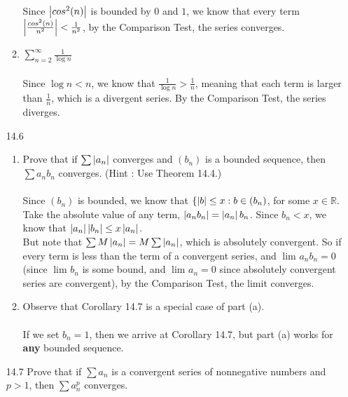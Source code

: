 \begin{enumerate}
\begin{enumerate}
        Since $\left\vert cos^2(n) \right\vert$ is bounded by $0$ and $1$, we know that every term $\left\vert \frac{cos^2(n)}{n^2} \right\vert < \frac{1}{n^2}$, by the Comparison Test, the series converges.\\

      \item $\sum_{n=2}^\infty \frac{1}{\log n}$\\\\

        Since $\log n < n$, we know that $\frac{1}{\log n} > \frac{1}{n}$, meaning that each term is larger than $\frac{1}{n}$, which is a divergent series. By the Comparison Test, the series diverges.\\
    \end{enumerate}
  \item [14.6]
    \begin{enumerate}
      \item Prove that if $\sum \left\vert a_n \right\vert$ converges and $(b_n)$ is a bounded sequence, then $\sum a_nb_n$ converges. (Hint : Use Theorem 14.4.)\\\\

        Since $(b_n)$ is bounded, we know that $\{\left\vert b \right\vert \leq x : b \in (b_n)$, for some $x \in \mathds{R}$. Take the absolute value of any term, $\left\vert a_nb_n \right\vert = \left\vert a_n \right\vert{b_n}$. Since $b_n < x$, we know that $\left\vert a_n \right\vert\left\vert b_n \right\vert \leq x \left\vert a_n \right\vert$.\\

        But note that $\sum M \left\vert a_n \right\vert = M \sum \left\vert a_n \right\vert$, which is absolutely convergent. So if every term is less than the term of a convergent series, and $\lim_{} a_n b_n = 0$ (since $\lim_{} b_n$ is some bound, and $\lim_{} a_n = 0$ since absolutely convergent series are convergent), by the Comparison Test, the limit converges.\\

      \item Observe that Corollary 14.7 is a special case of part (a).\\\\

        If we set $b_n = 1$, then we arrive at Corollary 14.7, but part (a) works for \textbf{any} bounded sequence.
    \end{enumerate}
  \item [14.7]
    Prove that if $\sum a_n$ is a convergent series of nonnegative numbers and $p > 1$, then $\sum a_n^p$ converges.\\\\


\end{enumerate}
